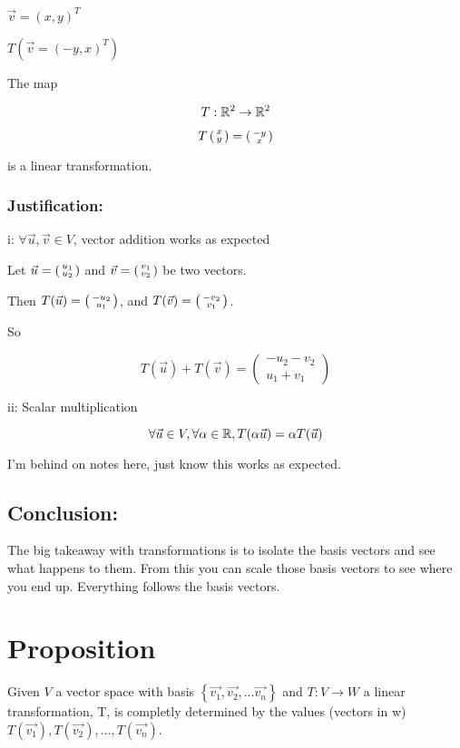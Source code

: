 \documentclass[a4paper]{article}
\begin{document}
$\vec{v} = (x, y)^T$

$T(\vec{v} = (-y, x)^T)$

The map

\[T: \mathbb{R}^2 \to \mathbb{R}^2\]

\[T \left(\begin{smallmatrix} x \\ y \end{smallmatrix} \right) = \left(\begin{smallmatrix} -y \\ x \end{smallmatrix} \right) \]

is a linear transformation.

\subsubsection*{Justification:}

i: $\forall \vec{u}, \vec{v} \in V$, vector addition works as expected

Let $\vec{u} = \left(\begin{smallmatrix} u_1 \\ u_2 \end{smallmatrix} \right)$ and $\vec{v} = \left(\begin{smallmatrix} v_1 \\ v_2 \end{smallmatrix} \right)$ be two vectors.

Then $T(\vec{u}) = \left(\begin{smallmatrix} -u_2 \\ u_1 \end{smallmatrix} \right)$, and $T(\vec{v}) = \left(\begin{smallmatrix} -v_2 \\ v_1 \end{smallmatrix} \right)$. 

So 

\[T(\vec{u}) + T(\vec{v}) = 
\begin{pmatrix}
	-u_2 - v_2 \\
	u_1 + v_1
\end{pmatrix}
\]

ii: Scalar multiplication

\[\forall \vec{u} \in V, \forall \alpha \in \mathbb{R}, T(\alpha \vec{u}) = \alpha T(\vec{u})\]

I'm behind on notes here, just know this works as expected.

\subsection*{Conclusion:}

The big takeaway with transformations is to isolate the basis vectors and see what happens to them. From this you can scale those basis vectors to see where you end up. Everything follows the basis vectors.

\section*{Proposition}
Given $V$ a vector space with basis $\left\{ \vec{v_1}, \vec{v_2}, \dots \vec{v_n} \right\}$ and $T: V \to W$ a linear transformation, T, is completly determined by the values (vectors in w) $T(\vec{v_1}), T(\vec{v_2}), \dots, T(\vec{v_n})$. 
\end{document}

